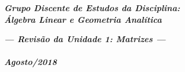 \documentclass[pdftex, brazil, 12pt, oneside, addpoints]{exam}
\begin{document}
\begin{coverpages}

\begin{center}
\textbf{\textit{\Large%
Grupo Discente de Estudos da Disciplina:\\
Álgebra Linear e Geometria Analítica}}
\end{center}

\vspace{1cm}

\begin{figure}[H]
\begin{center}
\end{center}
\end{figure}

\vspace{1cm}

\begin{center}
\textit{\textbf{\Large%
--- Revisão da Unidade 1: Matrizes ---\\
\ \\
Agosto/2018}}
\end{center}



\end{coverpages}
\end{document}
